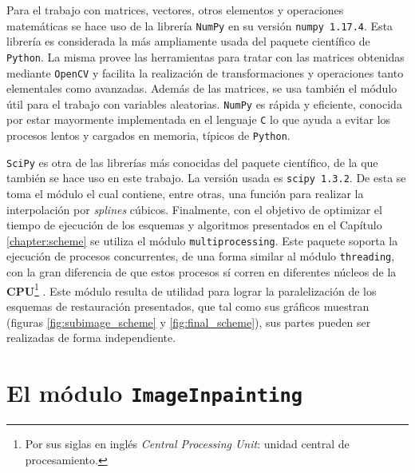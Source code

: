 Para el trabajo con matrices, vectores, otros elementos y operaciones matem\'aticas se hace uso de la librer\'ia \texttt{NumPy} en su versi\'on \texttt{numpy 1.17.4}. Esta librer\'ia es considerada la m\'as ampliamente usada del paquete científico de \texttt{Python}. La misma provee las herramientas para tratar con las matrices obtenidas mediante \texttt{OpenCV} y facilita la realización de transformaciones y operaciones tanto elementales como avanzadas. Adem\'as de las matrices, se usa tambi\'en el m\'odulo  \'util para el trabajo con variables aleatorias. \texttt{NumPy} es r\'apida y eficiente, conocida por estar mayormente implementada en el lenguaje \texttt{C} lo que ayuda a evitar los procesos lentos y cargados en memoria, t\'ipicos de \texttt{Python}.

\texttt{SciPy} es otra de las librer\'ias m\'as conocidas del paquete científico, de la que tambi\'en se hace uso en este trabajo. La versión usada es \texttt{scipy 1.3.2}. De esta se toma el m\'odulo  el cual contiene, entre otras, una funci\'on para realizar la interpolaci\'on por \textit{splines} c\'ubicos. Finalmente, con el objetivo de optimizar el tiempo de ejecuci\'on de los esquemas y algoritmos presentados en el Cap\'itulo \ref{chapter:scheme} se utiliza el m\'odulo \texttt{multiprocessing}. Este paquete soporta la ejecuci\'on de procesos concurrentes, de una forma similar al m\'odulo \texttt{threading}, con la gran diferencia de que estos procesos s\'i corren en diferentes n\'ucleos de la \textbf{CPU}\footnote{Por sus siglas en ingl\'es \textit{Central Processing Unit}: unidad central de procesamiento.} \cite{enwiki:cpu}. Este m\'odulo resulta de utilidad para lograr la paralelizaci\'on de los esquemas de restauraci\'on presentados, que tal como sus gr\'aficos muestran (figuras \ref{fig:subimage_scheme} y \ref{fig:final_scheme}), sus partes pueden ser realizadas de forma independiente.

\section{El m\'odulo \texttt{ImageInpainting}}\label{sec:imageinpainting_module}

